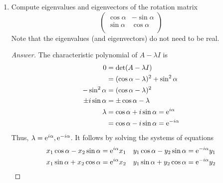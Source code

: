\documentclass[../psets.tex]{subfiles}
\begin{document}
\begin{enumerate}[label={\textbf{1.\arabic*.}}]
\begin{enumerate}
        \begin{proof}[Answer]
            True.\par
            Let $A\x=\lambda\x$ and $A\y=\lambda\y$. Then
            \begin{align*}
                A(\alpha\x+\beta\y) &= \alpha A\x+\beta A\y\\
                &= \alpha\lambda\x+\beta\lambda\y\\
                &= \lambda(\alpha\x+\beta\y)
            \end{align*}
            as desired.
        \end{proof}
    \end{enumerate}
    \item Compute eigenvalues and eigenvectors of the rotation matrix
    \begin{equation*}
        \begin{pmatrix}
            \cos\alpha & -\sin\alpha\\
            \sin\alpha & \cos\alpha\\
        \end{pmatrix}
    \end{equation*}
    Note that the eigenvalues (and eigenvectors) do not need to be real.
    \begin{proof}[Answer]
        The characteristic polynomial of $A-\lambda I$ is
        \begin{align*}
            0 &= \det(A-\lambda I)\\
            &= (\cos\alpha-\lambda)^2+\sin^2\alpha\\
            -\sin^2\alpha &= (\cos\alpha-\lambda)^2\\
            \pm i\sin\alpha &= \pm\cos\alpha-\lambda\\
            \lambda &= \cos\alpha+i\sin\alpha = \e[i\alpha]\\
            &= \cos\alpha-i\sin\alpha = \e[-i\alpha]
        \end{align*}
        Thus, $\lambda=\e[i\alpha],\e[-i\alpha]$. It follows by solving the systems of equations
        \begin{align*}
            x_1\cos\alpha-x_2\sin\alpha &= \e[i\alpha]x_1&
                y_1\cos\alpha-y_2\sin\alpha &= \e[-i\alpha]y_1\\
            x_1\sin\alpha+x_2\cos\alpha &= \e[i\alpha]x_2&
                y_1\sin\alpha+y_2\cos\alpha &= \e[-i\alpha]y_2\\
        \end{align*}

\end{proof}
\end{enumerate}
\end{document}
